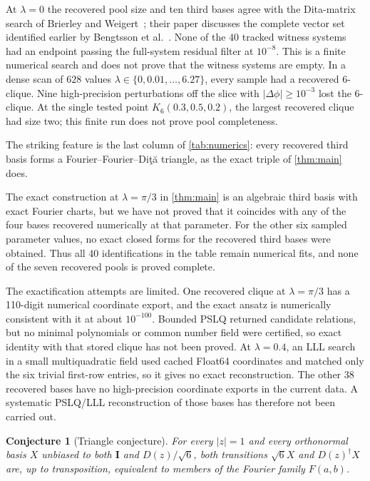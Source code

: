 \documentclass[11pt]{article}
\numberwithin{equation}{section}
\theoremstyle{plain}
\newtheorem{conjecture}[theorem]{Conjecture}
\theoremstyle{definition}
\theoremstyle{remark}
\newcommand{\I}{\mathbf{I}}
\newcommand{\dg}{^{\dagger}}
\newcommand{\Dita}{\texorpdfstring{Di\c{t}\u{a}}{Dita}}
\begin{document}
At $\lambda=0$ the recovered pool size and ten third bases agree with the Dita-matrix search of Brierley and Weigert~\cite{Brierley2009}; their paper discusses the complete vector set identified earlier by Bengtsson et al.~\cite{BengtssonMUH2007}. None of the $40$ tracked witness systems had an endpoint passing the full-system residual filter at $10^{-8}$. This is a finite numerical search and does not prove that the witness systems are empty. In a dense scan of $628$ values $\lambda\in\{0,0.01,\dots,6.27\}$, every sample had a recovered $6$-clique. Nine high-precision perturbations off the slice with $|\Delta\phi|\ge10^{-3}$ lost the $6$-clique. At the single tested point $K_6(0.3,0.5,0.2)$, the largest recovered clique had size two; this finite run does not prove pool completeness.

The striking feature is the last column of \cref{tab:numerics}: every recovered third basis forms a Fourier--Fourier--\Dita{} triangle, as the exact triple of \cref{thm:main} does.

The exact construction at $\lambda=\pi/3$ in \cref{thm:main} is an algebraic third basis with exact Fourier charts, but we have not proved that it coincides with any of the four bases recovered numerically at that parameter. For the other six sampled parameter values, no exact closed forms for the recovered third bases were obtained. Thus all 40 identifications in the table remain numerical fits, and none of the seven recovered pools is proved complete.

The exactification attempts are limited. One recovered clique at $\lambda=\pi/3$ has a 110-digit numerical coordinate export, and the exact ansatz is numerically consistent with it at about $10^{-100}$. Bounded PSLQ returned candidate relations, but no minimal polynomials or common number field were certified, so exact identity with that stored clique has not been proved. At $\lambda=0.4$, an LLL search in a small multiquadratic field used cached Float64 coordinates and matched only the six trivial first-row entries, so it gives no exact reconstruction. The other 38 recovered bases have no high-precision coordinate exports in the current data. A systematic PSLQ/LLL reconstruction of those bases has therefore not been carried out.

\begin{conjecture}[Triangle conjecture]\label{conj:triangle}
For every $|z|=1$ and every orthonormal basis $X$ unbiased to both $\I$ and $D(z)/\sqrt6$, both transitions $\sqrt6X$ and $D(z)\dg X$ are, up to transposition, equivalent to members of the Fourier family $F(a,b)$.
\end{conjecture}
\end{document}
